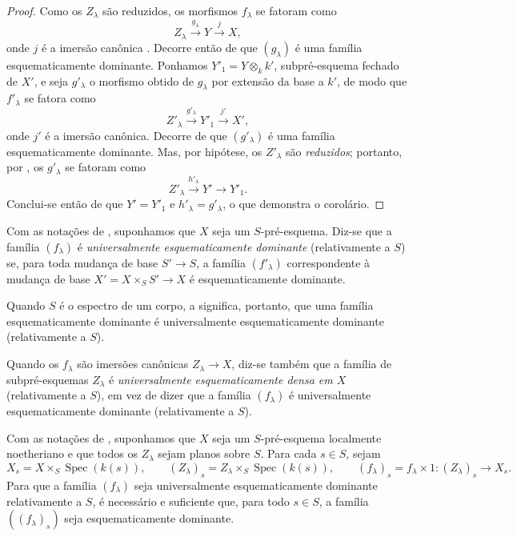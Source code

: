 \begin{proof}
Como os $Z_\lambda$
são reduzidos, os
morfismos
$f_\lambda$ se
fatoram como
\[
Z_\lambda
\xrightarrow{g_\lambda}
Y\xrightarrow{j}X,
\]
onde $j$ é a
imersão canônica
.
Decorre então de
que $(g_\lambda)$
é uma família
esquematicamente
dominante. Ponhamos
$Y'_1=Y\otimes_k k'$,
subpré-esquema
fechado de $X'$,
e seja $g'_\lambda$
o morfismo obtido
de $g_\lambda$ por
extensão da base
a $k'$, de modo
que $f'_\lambda$
se fatora como
\[
Z'_\lambda
\xrightarrow{g'_\lambda}
Y'_1\xrightarrow{j'}X',
\]
onde $j'$ é a
imersão canônica.
Decorre de
que $(g'_\lambda)$
é uma família
esquematicamente
dominante. Mas,
por hipótese, os
$Z'_\lambda$ são
\emph{reduzidos};
portanto, por
,
os $g'_\lambda$
se fatoram como
\[
Z'_\lambda
\xrightarrow{h'_\lambda}
Y'\to Y'_1.
\]
Conclui-se então
de 
que $Y'=Y'_1$ e
$h'_\lambda=
g'_\lambda$, o
que demonstra o
corolário.
\end{proof}

\begin{definition}[11.10.8]
\label{IV.11.10.8}
Com as notações de
,
suponhamos que $X$
seja um
$S$-pré-esquema.
Diz-se que a família
$(f_\lambda)$ é
\emph{universalmente
esquematicamente
dominante}
(relativamente a $S$)
se, para toda
mudança de base
$S'\to S$, a família
$(f'_\lambda)$
correspondente à
mudança de base
$X'=X\times_S S'
\to X$ é
esquematicamente
dominante.
\end{definition}

Quando $S$ é o
espectro de um corpo,
a
significa, portanto,
que uma família
esquematicamente
dominante é
universalmente
esquematicamente
dominante
(relativamente a $S$).

Quando os
$f_\lambda$ são
imersões canônicas
$Z_\lambda\to X$,
diz-se também que a
família de
subpré-esquemas
$Z_\lambda$ é
\emph{universalmente
esquematicamente densa
em $X$}
(relativamente a $S$),
em vez de dizer que
a família
$(f_\lambda)$ é
universalmente
esquematicamente
dominante
(relativamente a $S$).

\begin{theorem}[11.10.9]
\label{IV.11.10.9}
Com as notações de
,
suponhamos que $X$
seja um
$S$-pré-esquema
localmente
noetheriano e que
todos os
$Z_\lambda$ sejam
planos sobre $S$.
Para cada $s\in S$,
sejam
\[
X_s=X\times_S
\operatorname{Spec}(k(s)),
\qquad
(Z_\lambda)_s=
Z_\lambda\times_S
\operatorname{Spec}(k(s)),
\qquad
(f_\lambda)_s=
f_\lambda\times1:
(Z_\lambda)_s\to X_s.
\]
Para que a família
$(f_\lambda)$ seja
universalmente
esquematicamente
dominante
relativamente a $S$,
é necessário e
suficiente que, para
todo $s\in S$, a
família
$((f_\lambda)_s)$
seja
esquematicamente
dominante.
\end{theorem}

